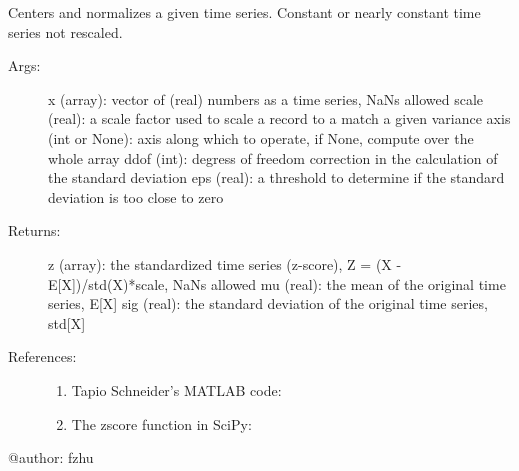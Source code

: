 \documentclass[letterpaper,10pt,english]{sphinxmanual}
\begin{document}
\begin{fulllineitems}
\label{\detokenize{Timeseries:pyleoclim.Timeseries.standardize}}
Centers and normalizes a given time series. Constant or nearly constant time series not rescaled.
\begin{description}
\item[{Args:}] \leavevmode
x (array): vector of (real) numbers as a time series, NaNs allowed
scale (real): a scale factor used to scale a record to a match a given variance
axis (int or None): axis along which to operate, if None, compute over the whole array
ddof (int): degress of freedom correction in the calculation of the standard deviation
eps (real): a threshold to determine if the standard deviation is too close to zero

\item[{Returns:}] \leavevmode
z (array): the standardized time series (z-score), Z = (X - E{[}X{]})/std(X)*scale, NaNs allowed
mu (real): the mean of the original time series, E{[}X{]}
sig (real): the standard deviation of the original time series, std{[}X{]}

\item[{References:}] \leavevmode\begin{enumerate}
\def\theenumi{\arabic{enumi}}
\def\labelenumi{\theenumi .}
\makeatletter\def\p@enumii{\p@enumi \theenumi .}\makeatother
\item {} 
Tapio Schneider’s MATLAB code: 

\item {} 
The zscore function in SciPy: 

\end{enumerate}

\end{description}

@author: fzhu

\end{fulllineitems}

\end{document}
